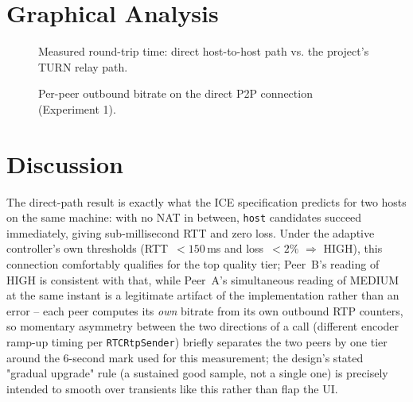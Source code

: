 \documentclass[12pt,a4paper]{report}
\begin{document}
\section{Graphical Analysis}
\begin{figure}[h]
\centering
{}
\caption{Measured round-trip time: direct host-to-host path vs. the project's TURN relay path.}
\end{figure}

\begin{figure}[h]
\centering
{}
\caption{Per-peer outbound bitrate on the direct P2P connection (Experiment 1).}
\end{figure}

\section{Discussion}
The direct-path result is exactly what the ICE specification predicts for two hosts on the
same machine: with no NAT in between, \texttt{host} candidates succeed immediately, giving
sub-millisecond RTT and zero loss. Under the adaptive controller's own thresholds
(RTT~$<150$\,ms and loss~$<2\%$ $\Rightarrow$ HIGH), this connection comfortably qualifies
for the top quality tier; Peer~B's reading of HIGH is consistent with that, while Peer~A's
simultaneous reading of MEDIUM at the same instant is a legitimate artifact of the
implementation rather than an error -- each peer computes its \emph{own} bitrate from its
own outbound RTP counters, so momentary asymmetry between the two directions of a call
(different encoder ramp-up timing per \texttt{RTCRtpSender}) briefly separates the two
peers by one tier around the 6-second mark used for this measurement; the design's stated
"gradual upgrade" rule (a sustained good sample, not a single one) is precisely intended to
smooth over transients like this rather than flap the UI.
\end{document}
